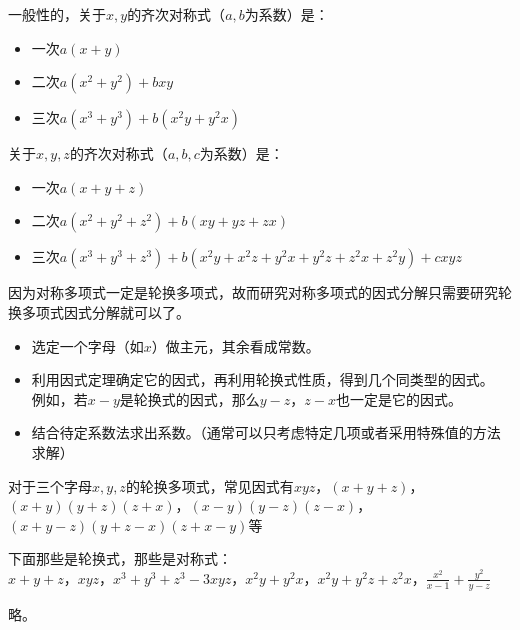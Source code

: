 \documentclass[windows,csize4]{BHCexam}
\begin{document}
\begin{groups}
    一般性的，关于$x,y$的齐次对称式（$a,b$为系数）是：
    \begin{itemize}
        \item 一次$a(x+y)$
        \item 二次$a(x^2+y^2)+bxy$
        \item 三次$a(x^3+y^3)+b(x^2y+y^2x)$
    \end{itemize}
    关于$x,y,z$的齐次对称式（$a,b,c$为系数）是：
    \begin{itemize}
        \item 一次$a(x+y+z)$
        \item 二次$a(x^2+y^2+z^2)+b(xy+yz+zx)$
        \item 三次$a(x^3+y^3+z^3)+b(x^2y+x^2z+y^2x+y^2z+z^2x+z^2y)+cxyz$
    \end{itemize}

    因为对称多项式一定是轮换多项式，故而研究对称多项式的因式分解只需要研究轮换多项式因式分解就可以了。
    \begin{itemize}
        \item 选定一个字母（如$x$）做主元，其余看成常数。
        \item 利用因式定理确定它的因式，再利用轮换式性质，得到几个同类型的因式。
        例如，若$x-y$是轮换式的因式，那么$y-z$，$z-x$也一定是它的因式。
        \item 结合待定系数法求出系数。（通常可以只考虑特定几项或者采用特殊值的方法求解）
    \end{itemize}
    对于三个字母$x,y,z$的轮换多项式，常见因式有$xyz$，$(x+y+z)$，$(x+y)(y+z)(z+x)$，$(x-y)(y-z)(z-x)$，
    $(x+y-z)(y+z-x)(z+x-y)$等


    \begin{questions}[]
        \question[5] 下面那些是轮换式，那些是对称式：\\ 
        $x+y+z$，$xyz$，$x^3+y^3+z^3-3xyz$，$x^2y+y^2x$，$x^2y+y^2z+z^2x$，$\frac{x^2}{x-1}+\frac{y^2}{y-z}$
        \begin{solution}{0.5cm}
            \methodonly 略。
        \end{solution}
        \vspace{3.5cm}


\end{questions}
\end{groups}
\end{document}
